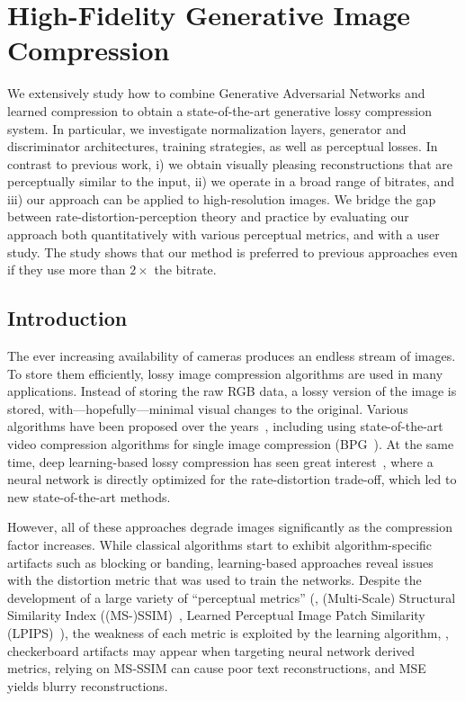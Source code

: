 \chapter{High-Fidelity Generative Image Compression}\label{ch:hific}

We extensively study how to combine Generative Adversarial Networks and learned compression to obtain a state-of-the-art generative lossy compression system. In particular, we investigate normalization layers, generator and discriminator architectures, training strategies, as well as perceptual losses. In contrast to previous work, i) we obtain visually pleasing reconstructions that are perceptually similar to the input, ii) we operate in a broad range of bitrates, and iii) our approach can be applied to high-resolution images. We bridge the gap between rate-distortion-perception theory and practice by evaluating our approach both quantitatively with various perceptual metrics, and with a user study. The study shows that our method is preferred to previous approaches even if they use more than $2{\times}$ the bitrate.

\section{Introduction}

The ever increasing availability of cameras produces an endless stream of images. To store them efficiently, lossy image compression algorithms are used in many applications. Instead of storing the raw RGB data, a lossy version of the image is stored, with---hopefully---minimal visual changes to the original. Various algorithms have been proposed over the years~\cite{jpeg1992wallace,jpeg2000taubman,webpurl},
including using state-of-the-art video compression algorithms for single image compression (BPG~\cite{bpg}). 
At the same time, deep learning-based lossy compression has seen great interest~\cite{toderici2015variable,balle2016end,mentzer2018conditional}, where a neural network is directly optimized for the rate-distortion trade-off, which led to new state-of-the-art methods.

However, all of these approaches degrade images significantly as the compression factor increases.
While classical algorithms start to exhibit algorithm-specific artifacts such as blocking or banding, learning-based approaches reveal issues with the distortion metric that was used to train the networks.
Despite the development of a large variety of ``perceptual metrics'' (\eg, (Multi-Scale) Structural Similarity Index (\mbox{(MS-)SSIM)}~\cite{SSIM,SSIM-MS}, Learned Perceptual Image Patch Similarity (LPIPS)~\cite{zhang2018unreasonable}), the weakness of each metric is exploited by the learning algorithm, \eg, checkerboard artifacts may appear when targeting neural network derived metrics, relying on MS-SSIM can cause poor text reconstructions, and MSE yields blurry reconstructions.

